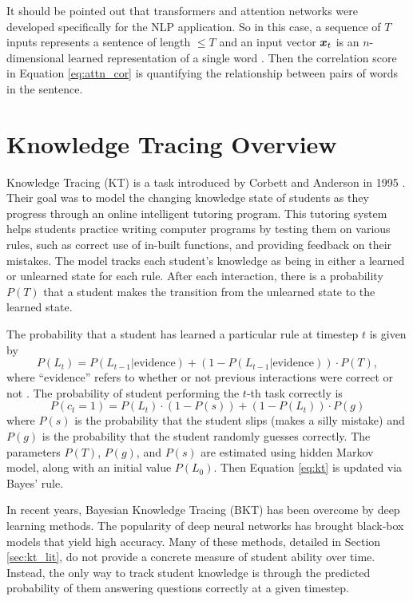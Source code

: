 It should be pointed out that transformers and attention networks were developed specifically for the NLP application. So in this case, a sequence of $T$ inputs represents a sentence of length $\leq T$ and an input vector $\boldsymbol{x}_t$ is an $n$-dimensional learned representation of a single word \cite{mikolov2013}. Then the correlation score in Equation \ref{eq:attn_cor} is quantifying the relationship between pairs of words in the sentence.


\section*{Knowledge Tracing Overview}
Knowledge Tracing (KT) is a task introduced by Corbett and Anderson in 1995 \cite{corbett1995}. Their goal was to model the changing knowledge state of students as they progress through an online intelligent tutoring program. This tutoring system helps students practice writing computer programs by testing them on various rules, such as correct use of in-built functions, and providing feedback on their mistakes. The model tracks each student's knowledge as being in either a learned or unlearned state for each rule. After each interaction, there is a probability $P(T)$ that a student makes the transition from the unlearned state to the learned state.

The probability that a student has learned a particular rule at timestep $t$ is given by
\begin{equation}
  P(L_t) = P(L_{t-1} | \text{evidence}) + (1 - P(L_{t-1} | \text{evidence})) \cdot P(T),
\label{eq:kt}
\end{equation}
where ``evidence'' refers to whether or not previous interactions were correct or not \cite{corbett1995}. The probability of student performing the $t$-th task correctly is 
\begin{equation}
  P(c_t = 1) = P(L_t) \cdot (1 - P(s)) + (1 - P(L_t))\cdot P(g)
  \label{eq:kt_prob_correct}
\end{equation}
where $P(s)$ is the probability that the student slips (makes a silly mistake) and $P(g)$ is the probability that the student randomly guesses correctly. The parameters $P(T)$, $P(g)$, and $P(s)$ are estimated using hidden Markov model, along with an initial value $P(L_0)$. Then Equation \ref{eq:kt} is updated via Bayes' rule.

In recent years, Bayesian Knowledge Tracing (BKT) has been overcome by deep learning methods. The popularity of deep neural networks has brought black-box models that yield high accuracy. Many of these methods, detailed in Section \ref{sec:kt_lit}, do not provide a concrete measure of student ability over time. Instead, the only way to track student knowledge is through the predicted probability of them answering questions correctly at a given timestep. 

